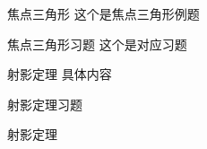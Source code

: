 \begin{example}{焦点三角形}
这个是焦点三角形例题
\end{example}%
\begin{exercise}{焦点三角形习题}
这个是对应习题
\end{exercise}
\begin{example}{射影定理}
具体内容
\end{example}
\begin{exercise}{射影定理习题}

\end{exercise}
\begin{exercise}{射影定理}
$$
\end{exercise}

